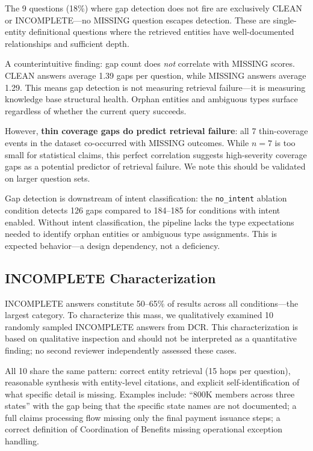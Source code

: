 \documentclass[11pt,a4paper]{article}
\begin{document}
The 9 questions (18\%) where gap detection does not fire are exclusively CLEAN or INCOMPLETE---no MISSING question escapes detection. These are single-entity definitional questions where the retrieved entities have well-documented relationships and sufficient depth.

A counterintuitive finding: gap count does \emph{not} correlate with MISSING scores. CLEAN answers average 1.39 gaps per question, while MISSING answers average 1.29. This means gap detection is not measuring retrieval failure---it is measuring knowledge base structural health. Orphan entities and ambiguous types surface regardless of whether the current query succeeds.

However, \textbf{thin coverage gaps do predict retrieval failure}: all 7 thin-coverage events in the dataset co-occurred with MISSING outcomes. While $n = 7$ is too small for statistical claims, this perfect correlation suggests high-severity coverage gaps as a potential predictor of retrieval failure. We note this should be validated on larger question sets.

Gap detection is downstream of intent classification: the \texttt{no\_intent} ablation condition detects 126 gaps compared to 184--185 for conditions with intent enabled. Without intent classification, the pipeline lacks the type expectations needed to identify orphan entities or ambiguous type assignments. This is expected behavior---a design dependency, not a deficiency.

\subsection{INCOMPLETE Characterization}

INCOMPLETE answers constitute 50--65\% of results across all conditions---the largest category. To characterize this mass, we qualitatively examined 10 randomly sampled INCOMPLETE answers from DCR. This characterization is based on qualitative inspection and should not be interpreted as a quantitative finding; no second reviewer independently assessed these cases.

All 10 share the same pattern: correct entity retrieval (15 hops per question), reasonable synthesis with entity-level citations, and explicit self-identification of what specific detail is missing. Examples include: ``800K members across three states'' with the gap being that the specific state names are not documented; a full claims processing flow missing only the final payment issuance steps; a correct definition of Coordination of Benefits missing operational exception handling.
\end{document}
